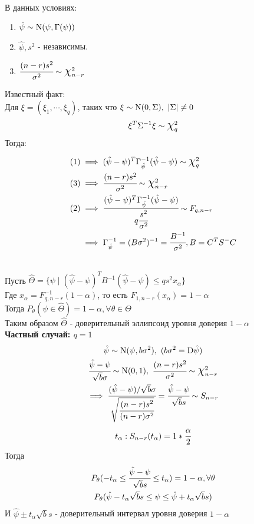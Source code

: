 \documentclass[main.tex]{subfiles}
\begin{document}
\begin{statement} ~\\
	В данных условиях:
	\begin{enumerate}
		\item $\hat\psi \sim \mathrm{N}(\psi, \Gamma(\psi))$
		\item $\hat\psi,s^2$ - независимы.
		\item $\cfrac{(n-r)s^2}{\sigma^2} \sim \mbox{\Large$\chi$}_{n-r}^2$
	\end{enumerate}
	Известный факт:\\
	Для $\xi = (\xi_1,\cdots,\xi_q)$, таких что $\xi \sim \mathrm{N}(0,\Sigma),\ |\Sigma| \neq 0$
	\[\xi^T\Sigma^{-1}\xi \sim \mbox{\Large$\chi$}_q^2\]
	Тогда:
	\begin{align*}
		(1) &\implies (\hat\psi-\psi)^T\Gamma^{-1}_{\hat\psi}(\hat\psi-\psi) \sim \mbox{\Large$\chi$}_q^2\\
		(3) &\implies \cfrac{(n-r)s^2}{\sigma^2} \sim \mbox{\Large$\chi$}_{n-r}^2\\
		(2) &\implies \cfrac{(\hat\psi-\psi)^T\Gamma^{-1}_{\hat\psi}(\hat\psi-\psi)}{q \cfrac{s^2}{\sigma^2}} \sim F_{q,n-r}\\
			&\implies \Gamma^{-1}_{\hat\psi} = (B\sigma^2)^{-1} = \cfrac{B^{-1}}{\sigma^2}, B = C^TS^-C
	\end{align*}
\end{statement}
\begin{definition} ~\\
Пусть $\hat\Theta = \{\psi \mid (\hat\psi - \psi)^TB^{-1}(\hat\psi - \psi) \leq qs^2x_\alpha\}$\\
Где $x_\alpha = F^{-1}_{q,n-r}(1-\alpha)$, то есть $F_{1,n-r}(x_\alpha)=1-\alpha$\\
Тогда $P_\theta(\psi \in \hat\Theta) = 1-\alpha, \forall \theta \in \Theta$\\
Таким образом $\hat\Theta$ - доверительный эллипсоид уровня доверия $1-\alpha$\\
\textbf{Частный случай: $q=1$}
\begin{gather*}
	\hat\psi \sim \sN(\psi,b\sigma^2),\ (b\sigma^2=\mathrm{D}\hat\psi)\\
	\cfrac{\hat\psi-\psi}{\sqrt{b}\sigma}\sim\sN(0,1),\ \cfrac{(n-r)s^2}{\sigma^2}\sim\bigchi_{n-r}^2\\
	\implies \cfrac{(\hat\psi-\psi)/\sqrt{b}\sigma}{\sqrt{\cfrac{(n-r)s^2}{(n-r)\sigma^2}}} = \cfrac{\hat\psi-\psi}{\sqrt{b}s} \sim S_{n-r}\\
	t_\alpha:S_{n-r}(t_\alpha) = 1 * \cfrac{\alpha}{2}
\end{gather*}
Тогда
\begin{gather*}
	P_\theta(-t_\alpha \leq \cfrac{\hat\psi-\psi}{\sqrt{b}s} \leq t_\alpha) = 1 - \alpha, \forall \theta\\
	P_\theta(\hat\psi - t_\alpha\sqrt{b}s \leq \psi \leq \hat\psi + t_\alpha\sqrt{b}s)\\
\end{gather*}
И $\hat\psi \pm t_\alpha\sqrt{b}s$ - доверительный интервал уровня доверия $1 - \alpha$
\end{definition}
\end{document}
